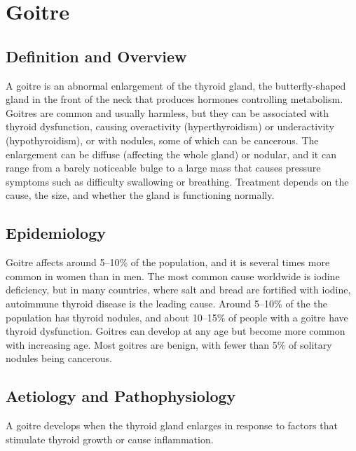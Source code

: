 \chapter{Goitre}

\section*{Definition and Overview}
A goitre is an abnormal enlargement of the thyroid gland, the butterfly-shaped gland in the front of the neck that produces hormones controlling metabolism. Goitres are common and usually harmless, but they can be associated with thyroid dysfunction, causing overactivity (hyperthyroidism) or underactivity (hypothyroidism), or with nodules, some of which can be cancerous. The enlargement can be diffuse (affecting the whole gland) or nodular, and it can range from a barely noticeable bulge to a large mass that causes pressure symptoms such as difficulty swallowing or breathing. Treatment depends on the cause, the size, and whether the gland is functioning normally.

\section*{Epidemiology}
Goitre affects around 5--10\% of the population, and it is several times more common in women than in men. The most common cause worldwide is iodine deficiency, but in many countries, where salt and bread are fortified with iodine, autoimmune thyroid disease is the leading cause. Around 5--10\% of the the population has thyroid nodules, and about 10--15\% of people with a goitre have thyroid dysfunction. Goitres can develop at any age but become more common with increasing age. Most goitres are benign, with fewer than 5\% of solitary nodules being cancerous.

\section*{Aetiology and Pathophysiology}
A goitre develops when the thyroid gland enlarges in response to factors that stimulate thyroid growth or cause inflammation.

